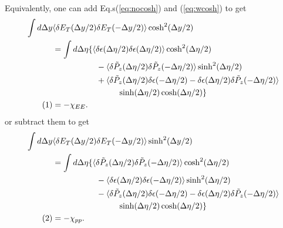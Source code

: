 \documentclass[12pt]{article}
\numberwithin{equation}{section}
\numberwithin{figure}{section}
\newcommand\eqnumber{\addtocounter{equation}{1}\tag{\theequation}}
\begin{document}
Equivalently, one can add  Eq.s(\ref{eq:nocosh}) and (\ref{eq:wcosh}) to get
\begin{align*}
\int d\Delta y&\langle \delta E_T(\Delta y/2)\delta E_T(-\Delta y/2)\rangle\cosh^2(\Delta y/2)\\
&=\int d\Delta\eta\large\{   \langle \delta\epsilon(\Delta\eta/2)\delta\epsilon(\Delta\eta/2)\rangle\cosh^2(\Delta\eta/2)\\
&~~~~~~~~~~~~~~~~-\langle\delta\tilde{P}_z(\Delta\eta/2)\delta\tilde{P}_z(-\Delta\eta/2)\rangle\sinh^2(\Delta\eta/2)\\
&~~~~~~~~~~~~~~~~+\langle \delta\tilde{P}_z(\Delta\eta/2)\delta\epsilon(-\Delta\eta/2)-\delta\epsilon(\Delta\eta/2)\delta\tilde{P}_z(-\Delta\eta/2)\rangle\\
&\hspace*{80pt}\sinh(\Delta \eta/2)\cosh(\Delta \eta/2)\large\}\\
\eqnumber\label{eq:alt1}
&=-\chi_{EE}.
\end{align*}
or subtract them to get
\begin{align*}
\int d\Delta y&\langle \delta E_T(\Delta y/2)\delta E_T(-\Delta y/2)\rangle\sinh^2(\Delta y/2)\\
&=\int d\Delta\eta\large\{\langle\delta\tilde{P}_z(\Delta\eta/2)\delta\tilde{P}_z(-\Delta\eta/2)\rangle\cosh^2(\Delta\eta/2)\\
&~~~~~~~~~~~~~~~~-\langle \delta\epsilon(\Delta\eta/2)\delta\epsilon(-\Delta\eta/2)\rangle\sinh^2(\Delta\eta/2)\\
&~~~~~~~~~~~~~~~~-\langle \delta\tilde{P}_z(\Delta\eta/2)\delta\epsilon(-\Delta\eta/2)-\delta\epsilon(\Delta\eta/2)\delta\tilde{P}_z(-\Delta\eta/2)\rangle\\
&\hspace*{80pt}\sinh(\Delta \eta/2)\cosh(\Delta \eta/2)\large\}\\
\eqnumber\label{eq:alt2}
&=-\chi_{pp}.
\end{align*}
\end{document}
